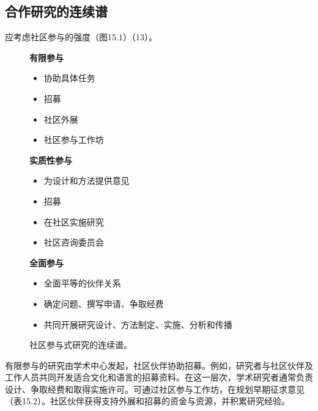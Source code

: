 \subsection{合作研究的连续谱}
应考虑社区参与的强度（图15.1）（13）。
\begin{figure}[htbp]
\centering
{}
\par\vspace{3pt}
\begin{minipage}[t]{.31\textwidth}\small\centering\textbf{有限参与}\par\raggedright
\begin{itemize}[leftmargin=1.1em]
\item 协助具体任务
\item 招募
\item 社区外展
\item 社区参与工作坊
\end{itemize}\end{minipage}\hfill
\begin{minipage}[t]{.31\textwidth}\small\centering\textbf{实质性参与}\par\raggedright
\begin{itemize}[leftmargin=1.1em]
\item 为设计和方法提供意见
\item 招募
\item 在社区实施研究
\item 社区咨询委员会
\end{itemize}\end{minipage}\hfill
\begin{minipage}[t]{.31\textwidth}\small\centering\textbf{全面参与}\par\raggedright
\begin{itemize}[leftmargin=1.1em]
\item 全面平等的伙伴关系
\item 确定问题、撰写申请、争取经费
\item 共同开展研究设计、方法制定、实施、分析和传播
\end{itemize}\end{minipage}
\caption{社区参与式研究的连续谱。}
\end{figure}

有限参与的研究由学术中心发起，社区伙伴协助招募。例如，研究者与社区伙伴及工作人员共同开发适合文化和语言的招募资料。在这一层次，学术研究者通常负责设计、争取经费和取得实施许可。可通过社区参与工作坊，在规划早期征求意见（表15.2）。社区伙伴获得支持外展和招募的资金与资源，并积累研究经验。

